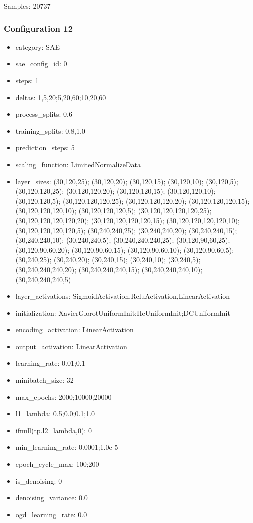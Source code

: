 \documentclass[a4paper,11pt,oneside]{article}
\theoremstyle{plain}
\theoremstyle{definition}
\begin{document}
Samples: 20737

\subsubsection{Configuration 12}\label{config12}
\begin{itemize}
	\item category: SAE
	\item sae\_config\_id: 0
	\item steps: 1
	\item deltas: 1,5,20;5,20,60;10,20,60
	\item process\_splits: 0.6
	\item training\_splits: 0.8,1.0
	\item prediction\_steps: 5
	\item scaling\_function: LimitedNormalizeData
	\item layer\_sizes: (30,120,25); (30,120,20); (30,120,15); (30,120,10); (30,120,5); (30,120,120,25); (30,120,120,20); (30,120,120,15); (30,120,120,10); (30,120,120,5); (30,120,120,120,25); (30,120,120,120,20); (30,120,120,120,15); (30,120,120,120,10); (30,120,120,120,5); (30,120,120,120,120,25); (30,120,120,120,120,20); (30,120,120,120,120,15); (30,120,120,120,120,10); (30,120,120,120,120,5); (30,240,240,25); (30,240,240,20); (30,240,240,15); (30,240,240,10); (30,240,240,5); (30,240,240,240,25); (30,120,90,60,25); (30,120,90,60,20); (30,120,90,60,15); (30,120,90,60,10); (30,120,90,60,5); (30,240,25); (30,240,20); (30,240,15); (30,240,10); (30,240,5); (30,240,240,240,20); (30,240,240,240,15); (30,240,240,240,10); (30,240,240,240,5)
	\item layer\_activations: SigmoidActivation,ReluActivation,LinearActivation
	\item initialization: XavierGlorotUniformInit;HeUniformInit;DCUniformInit
	\item encoding\_activation: LinearActivation
	\item output\_activation: LinearActivation
	\item learning\_rate: 0.01;0.1
	\item minibatch\_size: 32
	\item max\_epochs: 2000;10000;20000
	\item l1\_lambda: 0.5;0.0;0.1;1.0
	\item ifnull(tp.l2\_lambda,0): 0
	\item min\_learning\_rate: 0.0001;1.0e-5
	\item epoch\_cycle\_max: 100;200
	\item is\_denoising: 0
	\item denoising\_variance: 0.0
	\item ogd\_learning\_rate: 0.0
\end{itemize}
\end{document}
